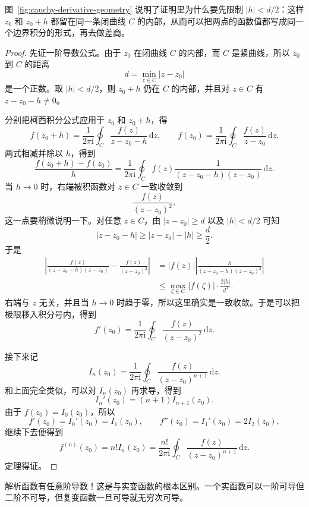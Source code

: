 图~\ref{fig:cauchy-derivative-geometry} 说明了证明里为什么要先限制 $|h|<d/2$：这样 $z_0$ 和 $z_0+h$ 都留在同一条闭曲线 $C$ 的内部，从而可以把两点的函数值都写成同一个边界积分的形式，再去做差商。

\begin{proof}
先证一阶导数公式。由于 $z_0$ 在闭曲线 $C$ 的内部，而 $C$ 是紧曲线，所以 $z_0$ 到 $C$ 的距离
\[
    d=\min_{z\in C}|z-z_0|
\]
是一个正数。取 $|h|<d/2$，则 $z_0+h$ 仍在 $C$ 的内部，并且对 $z\in C$ 有 $z-z_0-h\neq 0$。

分别把柯西积分公式应用于 $z_0$ 和 $z_0+h$，得
\[
    f(z_0+h)=\frac{1}{2\pi\mathrm{i}}\oint_C \frac{f(z)}{z-z_0-h}\,\mathrm{d}z,
    \qquad
    f(z_0)=\frac{1}{2\pi\mathrm{i}}\oint_C \frac{f(z)}{z-z_0}\,\mathrm{d}z.
\]
两式相减并除以 $h$，得到
\[
    \frac{f(z_0+h)-f(z_0)}{h}
    = \frac{1}{2\pi\mathrm{i}}\oint_C
    f(z)\frac{1}{(z-z_0-h)(z-z_0)}\,\mathrm{d}z.
\]
当 $h\to 0$ 时，右端被积函数对 $z\in C$ 一致收敛到
\[
    \frac{f(z)}{(z-z_0)^2},
\]
这一点要稍微说明一下。对任意 $z\in C$，由 $|z-z_0|\ge d$ 以及 $|h|<d/2$ 可知
\[
    |z-z_0-h|\ge |z-z_0|-|h| \ge \frac{d}{2}.
\]
于是
\begin{align}
    \left|
    \frac{f(z)}{(z-z_0-h)(z-z_0)} - \frac{f(z)}{(z-z_0)^2}
    \right|
    &= |f(z)|\left|\frac{h}{(z-z_0-h)(z-z_0)^2}\right| \\
    &\le \max_{\zeta\in C}|f(\zeta)|\cdot \frac{2|h|}{d^3}.
\end{align}
右端与 $z$ 无关，并且当 $h\to 0$ 时趋于零，所以这里确实是一致收敛。于是可以把极限移入积分号内，得到
\[
    f'(z_0)=\frac{1}{2\pi\mathrm{i}}\oint_C \frac{f(z)}{(z-z_0)^2}\,\mathrm{d}z.
\]

接下来记
\[
    I_n(z_0)=\frac{1}{2\pi\mathrm{i}}\oint_C \frac{f(z)}{(z-z_0)^{n+1}}\,\mathrm{d}z.
\]
和上面完全类似，可以对 $I_n(z_0)$ 再求导，得到
\[
    I_n'(z_0)=(n+1)I_{n+1}(z_0).
\]
由于 $f(z_0)=I_0(z_0)$，所以
\[
    f'(z_0)=I_0'(z_0)=I_1(z_0),\qquad
    f''(z_0)=I_1'(z_0)=2I_2(z_0),
\]
继续下去便得到
\[
    f^{(n)}(z_0)=n!I_n(z_0)
    = \frac{n!}{2\pi\mathrm{i}}\oint_C \frac{f(z)}{(z-z_0)^{n+1}}\,\mathrm{d}z.
\]
定理得证。
\end{proof}

\begin{tishi}[惊人结论]
解析函数有任意阶导数！这是与实变函数的根本区别。一个实函数可以一阶可导但二阶不可导，但复变函数一旦可导就无穷次可导。
\end{tishi}


